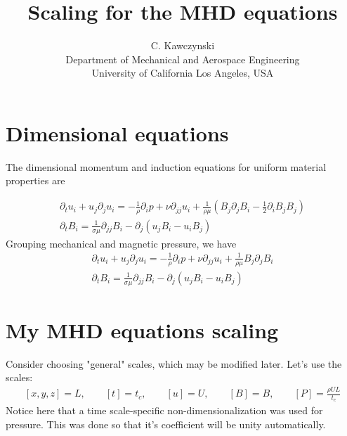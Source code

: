 \documentclass[11pt]{article}
\newcommand{\PD}{\partial}
\begin{document}
\doublespacing
\title{Scaling for the MHD equations}
\author{C. Kawczynski \\
Department of Mechanical and Aerospace Engineering \\
University of California Los Angeles, USA\\
}
\maketitle

\section{Dimensional equations}
The dimensional momentum and induction equations for uniform material properties are

\begin{equation}\begin{aligned}
\PD_t u_i+u_j\PD_j u_i = -\frac{1}{\rho} \PD_i p+ \nu \PD_{jj} u_i + \frac{1}{\rho \mu} (B_j \PD_j B_i - \tfrac{1}{2} \PD_i B_j B_j) \\
\PD_t B_i = \frac{1}{\sigma \mu} \PD_{jj} B_i - \PD_j (u_j B_i - u_i B_j)
\end{aligned}\end{equation}
Grouping mechanical and magnetic pressure, we have
\begin{equation}\boxed{\begin{aligned}
\PD_t u_i+u_j\PD_j u_i = -\frac{1}{\rho} \PD_i p+ \nu \PD_{jj} u_i + \frac{1}{\rho \mu} B_j \PD_j B_i \\
\PD_t B_i = \frac{1}{\sigma \mu} \PD_{jj} B_i - \PD_j (u_j B_i - u_i B_j)
\end{aligned}}\end{equation}

\section{My MHD equations scaling}
Consider choosing "general" scales, which may be modified later. Let's use the scales:
\begin{equation}\begin{aligned}
	[x,y,z] = L, \qquad
	[t] = t_c, \qquad
	[u] = U, \qquad
	[B] = B, \qquad
	[P] = \frac{\rho U L}{t_c}
\end{aligned} \end{equation}
Notice here that a time scale-specific non-dimensionalization was used for pressure. This was done so that it's coefficient will be unity automatically.
\end{document}
